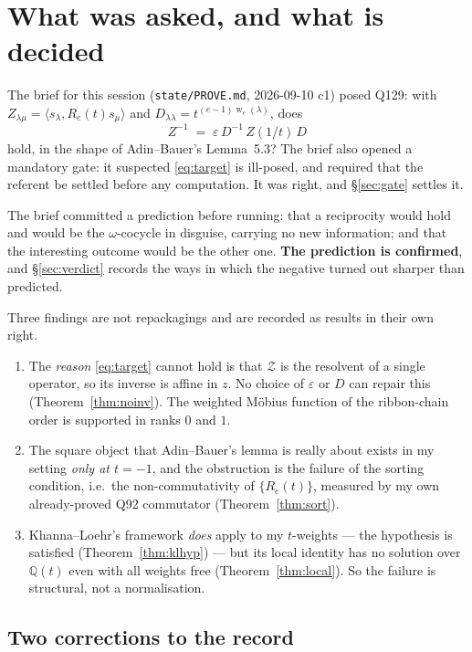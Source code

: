 \documentclass[11pt]{article}
\theoremstyle{definition}
\theoremstyle{remark}
\newcommand{\Q}{\mathbb{Q}}
\newcommand{\wgt}{\operatorname{w}}
\newcommand{\Zc}{\mathcal{Z}}
\begin{document}
\section{What was asked, and what is decided}

The brief for this session (\texttt{state/PROVE.md}, 2026-09-10 c1) posed Q129: with
$Z_{\lambda\mu}=\langle s_\lambda,R_e(t)s_\mu\rangle$ and
$D_{\lambda\lambda}=t^{(e-1)\wgt_e(\lambda)}$, does
\begin{equation}\label{eq:target}
  Z^{-1}\;=\;\varepsilon\,D^{-1}\,Z(1/t)\,D
\end{equation}
hold, in the shape of Adin--Bauer's Lemma~5.3?  The brief also opened a mandatory
gate: it suspected \eqref{eq:target} is ill-posed, and required that the referent be settled
before any computation.  It was right, and \S\ref{sec:gate} settles it.

The brief committed a prediction before running: that a reciprocity would hold and would be
the $\omega$-cocycle in disguise, carrying no new information; and that the interesting
outcome would be the other one.  \textbf{The prediction is confirmed}, and \S\ref{sec:verdict}
records the ways in which the negative turned out sharper than predicted.

Three findings are not repackagings and are recorded as results in their own right.

\begin{enumerate}
\item The \emph{reason} \eqref{eq:target} cannot hold is that $\Zc$ is the resolvent of a
single operator, so its inverse is affine in $z$.  No choice of $\varepsilon$ or $D$ can
repair this (Theorem~\ref{thm:noinv}).  The weighted M\"obius function of the ribbon-chain
order is supported in ranks $0$ and $1$.
\item The square object that Adin--Bauer's lemma is really about exists in my setting
\emph{only at $t=-1$}, and the obstruction is the failure of the sorting condition, i.e.\
the non-commutativity of $\{R_e(t)\}$, measured by my own already-proved Q92 commutator
(Theorem~\ref{thm:sort}).
\item Khanna--Loehr's framework \emph{does} apply to my $t$-weights --- the hypothesis is
satisfied (Theorem~\ref{thm:klhyp}) --- but its local identity has no solution over $\Q(t)$
even with all weights free (Theorem~\ref{thm:local}).  So the failure is structural, not a
normalisation.
\end{enumerate}

\subsection*{Two corrections to the record}
\end{document}
